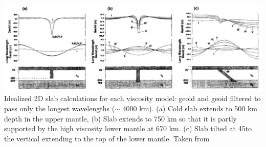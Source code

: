 \begin{center}
\includegraphics[width=15cm]{images/geoid/mogu96}
{\scriptsize Idealized 2D slab calculations for each viscosity model: geoid and geoid filtered 
to pass only the longest wavelengths ($\sim$ 4000 km).
(a) Cold slab extends to 500 km depth in the upper mantle, 
(b) Slab extends to 750 km so that it is partly supported by the high viscosity lower mantle at 670 km. 
(c) Slab tilted at 45\degree to the vertical extending to the top of the lower mantle. 
Taken from \cite{mogu96}}
\end{center}
